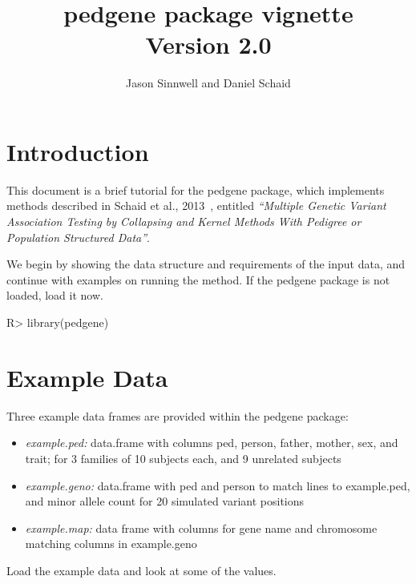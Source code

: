 \documentclass[letterpaper]{article}
\title{pedgene package vignette \\ 
        Version 2.0}
\author{Jason Sinnwell and Daniel Schaid}
\begin{document}
\maketitle

\section{Introduction}
This document is a brief tutorial for the pedgene package, which implements methods described
in Schaid et al., 2013~\cite{Schaid}, entitled {\sl ``Multiple Genetic Variant Association 
  Testing by Collapsing and Kernel Methods With Pedigree or Population Structured Data''}.   

We begin by showing the data structure and requirements of the input data, and continue with 
examples on running the method.  If the pedgene package is not loaded, load it now.

\begin{Schunk}
\begin{Sinput}
R> library(pedgene)
\end{Sinput}
\end{Schunk}


\section{Example Data}
Three example data frames are provided within the pedgene package: 
\begin{itemize}
\item{\em example.ped: }{ data.frame with columns ped, person, father, mother, sex, and trait;
        for 3 families of 10 subjects each, and 9 unrelated subjects}
\item{\em example.geno:}{ data.frame with ped and person to match lines to example.ped, and 
  minor allele count for 20 simulated variant positions}
\item{\em example.map: }{data frame with columns for gene name and chromosome matching 
  columns in example.geno}
\end{itemize}

\noindent Load the example data and look at some of the values.
\end{document}
